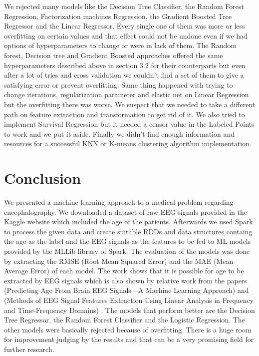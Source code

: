 	We rejected many models like the Decision Tree Classifier, the Random Forest Regression,  Factorization machines Regression, the Gradient Boosted Tree Regressor and the Linear Regressor. Every single one of them was more or less overfitting on certain values and that effect could not be undone even if we had options of hyperparameters to change or were in lack of them. The Random forest, Decision tree and Gradient Boosted approaches offered the same hyperparameters described above in section 3.2 for their counterparts but even after a lot of tries and cross validation we couldn’t find a set of them to give a satisfying error or prevent overfitting. Same thing happened with trying to change iterations, regularization parameter and elastic net on Linear Regression but the overfitting there was worse. We suspect that we needed to take a different path on feature extraction and transformation to get rid of it. We also tried to implement Survival Regression but it needed a censor value in the Labeled Points to work and we put it aside. Finally we didn’t find enough information and resources for a successful KNN or K-means clustering algorithm implementation.


\section{Conclusion}

We presented a machine learning approach to a medical problem regarding encephalography. We downloaded a dataset of raw EEG signals provided in the Kaggle website which included the age of the patients. Afterwards we used Spark to process the given data and create suitable RDDs and data structures containg the age as the label and the EEG signals as the features to be fed to ML models provided by the MLLib library of Spark. The evaluation of the models was done by extracting the RMSE (Root Mean Squared Error) and the MAE (Mean Average Error) of each model. The work shows that it is possible for age to be extracted by EEG signals which is also shown by relative work from the papers (Predicting Age From Brain EEG Signals—A Machine Learning Approach) \cite{braineeg} and (Methods of EEG Signal Features Extraction Using Linear Analysis in Frequency and Time-Frequency Domains) \cite{braineeg2} . The models that perform better are the Decision Tree Regressor, the Random Forest Classifier and the Logistic Regression. The other models were basically rejected because of overfitting. There is a huge room for improvement judging by the results and that can be a very promising field for further research.







